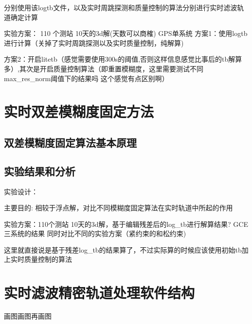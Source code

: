分别使用该log\underline{\space}tb文件，以及实时周跳探测和质量控制的算法分别进行实时滤波轨道确定计算

实验方案： 110 个测站 10天的3d解(天数可以商榷) GPS单系统
方案1：使用log\underline{\space}tb进行计算（关掉了实时周跳探测以及实时质量控制，纯解算)

方案2：开启litetb（感觉需要使用300s的阈值,否则这样信息感觉比事后的tb解算多）,其次是开启质量控制算法（即重置模糊度，这里需要测试不同max\_res\_norm阈值下的结果吗 这个感觉有点区别啊）

\section{实时双差模糊度固定方法}

\subsection{双差模糊度固定算法基本原理}

\subsection{实验结果和分析}

实验设计：

主要目的:
相较于浮点解，对比不同模糊度固定算法在实时轨道中所起的作用

实验方案：110个测站  10天的3d解，基于编辑残差后的log\_tb进行解算结果? GCE三系统的结果
同时对比不同的实验方案（紧约束的和松约束)

这里就直接说是基于残差log\_tb的结果算了，不过实际算的时候应该使用初始tb加上实时质量控制的算法

\section{实时滤波精密轨道处理软件结构}

画图画图再画图

